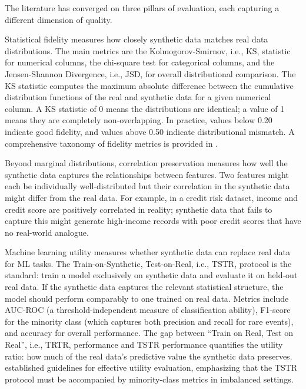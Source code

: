 The literature has converged on three pillars of evaluation, each capturing a different dimension of quality.

Statistical fidelity measures how closely synthetic data matches real data distributions. The main metrics are the Kolmogorov-Smirnov, i.e., KS, statistic for numerical columns, the chi-square test \cite{pearson1900criterion} for categorical columns, and the Jensen-Shannon Divergence, i.e., JSD, for overall distributional comparison. The KS statistic computes the maximum absolute difference between the cumulative distribution functions of the real and synthetic data for a given numerical column. A KS statistic of 0 means the distributions are identical; a value of 1 means they are completely non-overlapping. In practice, values below 0.20 indicate good fidelity, and values above 0.50 indicate distributional mismatch. A comprehensive taxonomy of fidelity metrics is provided in \cite{figueira2022survey}.

Beyond marginal distributions, correlation preservation measures how well the synthetic data captures the relationships between features. Two features might each be individually well-distributed but their correlation in the synthetic data might differ from the real data. For example, in a credit risk dataset, income and credit score are positively correlated in reality; synthetic data that fails to capture this might generate high-income records with poor credit scores that have no real-world analogue.

Machine learning utility measures whether synthetic data can replace real data for ML tasks. The Train-on-Synthetic, Test-on-Real, i.e., TSTR, protocol is the standard: train a model exclusively on synthetic data and evaluate it on held-out real data. If the synthetic data captures the relevant statistical structure, the model should perform comparably to one trained on real data. Metrics include AUC-ROC (a threshold-independent measure of classification ability), F1-score for the minority class (which captures both precision and recall for rare events), and accuracy for overall performance. The gap between ``Train on Real, Test on Real'', i.e., TRTR, performance and TSTR performance quantifies the utility ratio: how much of the real data's predictive value the synthetic data preserves. \cite{jordon2022fake} established guidelines for effective utility evaluation, emphasizing that the TSTR protocol must be accompanied by minority-class metrics in imbalanced settings.

